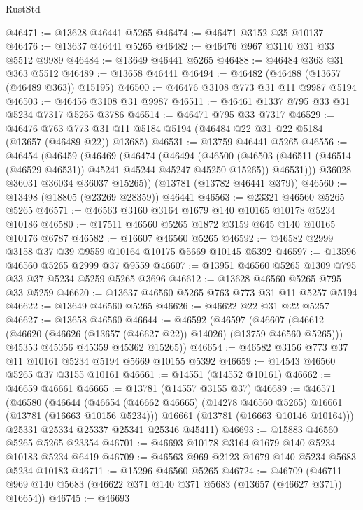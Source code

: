 \begin{lexlean}{RustStd}
\begin{coremodule}
@46471 := @13628 @46441 @5265
@46474 := @46471 @3152 @35 @10137
@46476 := @13637 @46441 @5265
@46482 := @46476 @967 @3110 @31 @33 @5512 @9989
@46484 := @13649 @46441 @5265
@46488 := @46484 @363 @31 @363 @5512
@46489 := @13658 @46441
@46494 := @46482 (@46488 (@13657 (@46489 @363)) @15195)
@46500 := @46476 @3108 @773 @31 @11 @9987 @5194
@46503 := @46456 @3108 @31 @9987
@46511 := @46461 @1337 @795 @33 @31 @5234 @7317 @5265 @3786
@46514 := @46471 @795 @33 @7317
@46529 := @46476
    @763
    @773
    @31
    @11
    @5184
    @5194
    (@46484 @22 @31 @22 @5184 (@13657 (@46489 @22)) @13685)
@46531 := @13759 @46441 @5265
@46556 := @46454
    (@46459
      (@46469
        (@46474
          (@46494
            (@46500
              (@46503 (@46511 (@46514 (@46529 @46531)) @45241 @45244 @45247 @45250 @15265))
              @46531)))
        @36028
        @36031
        @36034
        @36037
        @15265))
    (@13781 (@13782 @46441 @379))
@46560 := @13498 (@18805 (@23269 @28359)) @46441
@46563 := @23321 @46560 @5265 @5265
@46571 := @46563 @3160 @3164 @1679 @140 @10165 @10178 @5234 @10186
@46580 := @17511 @46560 @5265 @1872 @3159 @645 @140 @10165 @10176 @6787
@46582 := @16607 @46560 @5265
@46592 := @46582 @2999 @3158 @37 @39 @9559 @10164 @10175 @5669 @10145 @5392
@46597 := @13596 @46560 @5265 @2999 @37 @9559
@46607 := @13951 @46560 @5265 @1309 @795 @33 @37 @5234 @5259 @5265 @3696
@46612 := @13628 @46560 @5265 @795 @33 @5259
@46620 := @13637 @46560 @5265 @763 @773 @31 @11 @5257 @5194
@46622 := @13649 @46560 @5265
@46626 := @46622 @22 @31 @22 @5257
@46627 := @13658 @46560
@46644 := @46592
    (@46597
      (@46607
        (@46612 (@46620 (@46626 (@13657 (@46627 @22)) @14026) (@13759 @46560 @5265)))
        @45353
        @45356
        @45359
        @45362
        @15265))
@46654 := @46582 @3156 @773 @37 @11 @10161 @5234 @5194 @5669 @10155 @5392
@46659 := @14543 @46560 @5265 @37 @3155 @10161
@46661 := @14551 (@14552 @10161)
@46662 := @46659 @46661
@46665 := @13781 (@14557 @3155 @37)
@46689 := @46571
    (@46580
      (@46644
        (@46654 (@46662 @46665) (@14278 @46560 @5265) @16661 (@13781 (@16663 @10156 @5234)))
        @16661
        (@13781 (@16663 @10146 @10164)))
      @25331
      @25334
      @25337
      @25341
      @25346
      @45411)
@46693 := @15883 @46560 @5265 @5265 @23354
@46701 := @46693 @10178 @3164 @1679 @140 @5234 @10183 @5234 @6419
@46709 := @46563 @969 @2123 @1679 @140 @5234 @5683 @5234 @10183
@46711 := @15296 @46560 @5265
@46724 := @46709
    (@46711 @969 @140 @5683 (@46622 @371 @140 @371 @5683 (@13657 (@46627 @371)) @16654))
@46745 := @46693

\end{coremodule}
\end{lexlean}

